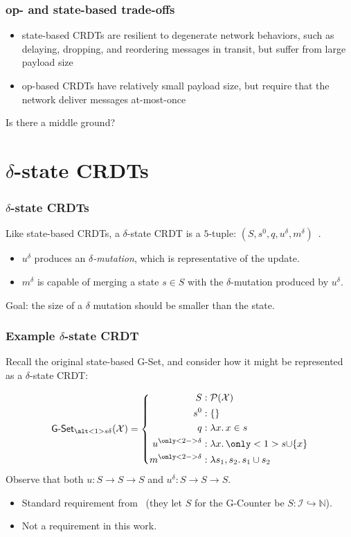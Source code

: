 \documentclass[aspectratio=169,compress,handout]{beamer}
\newcommand*{\CRDT}{\textsf{CRDT}\xspace}
\newcommand*{\CRDTs}{\textsf{CRDTs}\xspace}
\begin{document}
  \begin{frame}
    \frametitle{op- and state-based trade-offs}
    \begin{itemize}[<+->]
      \item state-based \CRDTs are resilient to degenerate network behaviors,
        such as delaying, dropping, and reordering messages in transit, but
        suffer from large payload size
      \item op-based \CRDTs have relatively small payload size, but require that
        the network deliver messages at-most-once
    \end{itemize}
    \pause
    Is there a middle ground?
  \end{frame}

  \section{$\delta$-state \CRDTs}
  \begin{frame}
    \frametitle{$\delta$-state \CRDTs}
    Like state-based \CRDTs, a $\delta$-state \CRDT is a $5$-tuple: $(S, s^0, q,
    u^\delta, m^\delta)$~\citep{almedia18}.
    \begin{itemize}
      \item $u^\delta$ produces an \emph{$\delta$-mutation}, which is
        representative of the update.
      \item $m^\delta$ is capable of merging a state $s \in S$ with the
        $\delta$-mutation produced by $u^\delta$.
    \end{itemize}
    Goal: the size of a $\delta$ mutation should be smaller than the state.
  \end{frame}

  \begin{frame}
    \frametitle{Example $\delta$-state \CRDT}
    Recall the original state-based G-Set, and consider how it might be
    represented as a $\delta$-state \CRDT:

    \[
      \textsf{G-Set}_{\alt<1>{s}{\delta}}(\mathcal{X}) = \left\{\begin{aligned}
        S &: \mathcal{P}(\mathcal{X}) \\
        s^0 &: \{ \} \\
        q &: \lambda x.\, x \in s \\
        u^{\only<2->{\delta}} &: \lambda x.\, \only<1>{s \cup} \{ x \} \\
        m^{\only<2->{\delta}} &: \lambda s_1, s_2.\, s_1 \cup s_2 \\
      \end{aligned}\right.
    \]
    \pause
    \pause
    Observe that both $u : S \to S \to S$ and $u^\delta : S \to S \to S$.
    \begin{itemize}[<+(1)->]
      \item Standard requirement from~\citet{almedia18} (they let $S$ for the
        G-Counter be $S : \mathcal{I} \hookrightarrow \mathbb{N}$).
      \item Not a requirement in this work.
    \end{itemize}
  \end{frame}
\end{document}
